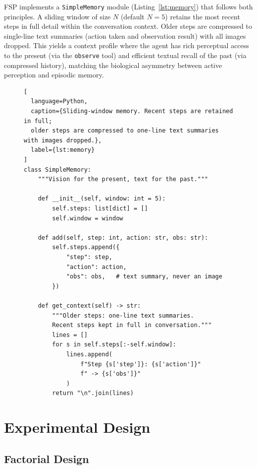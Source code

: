 \documentclass[11pt,a4paper]{article}
\begin{document}
\noindent
FSP implements a \texttt{SimpleMemory} module (Listing~\ref{lst:memory}) that
follows both principles. A sliding window of size $N$ (default $N{=}5$)
retains the most recent steps in full detail within the conversation context.
Older steps are compressed to single-line text summaries (action taken and
observation result) with all images dropped. This yields a context profile
where the agent has rich perceptual access to the present (via the
\texttt{observe} tool) and efficient textual recall of the past (via
compressed history), matching the biological asymmetry between active
perception and episodic memory.

\begin{figure}[t]
\begin{lstlisting}[
  language=Python,
  caption={Sliding-window memory. Recent steps are retained in full;
  older steps are compressed to one-line text summaries with images dropped.},
  label={lst:memory}
]
class SimpleMemory:
    """Vision for the present, text for the past."""

    def __init__(self, window: int = 5):
        self.steps: list[dict] = []
        self.window = window

    def add(self, step: int, action: str, obs: str):
        self.steps.append({
            "step": step,
            "action": action,
            "obs": obs,   # text summary, never an image
        })

    def get_context(self) -> str:
        """Older steps: one-line text summaries.
        Recent steps kept in full in conversation."""
        lines = []
        for s in self.steps[:-self.window]:
            lines.append(
                f"Step {s['step']}: {s['action']}"
                f" -> {s['obs']}"
            )
        return "\n".join(lines)
\end{lstlisting}
\end{figure}



\section{Experimental Design}
\label{sec:experimental-design}

\subsection{Factorial Design}
\end{document}
